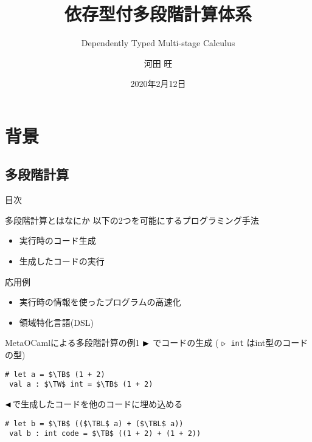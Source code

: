 \documentclass[dvipdfmx,aspectratio=169, 20pt]{beamer}
\title{依存型付多段階計算体系}
\subtitle{Dependently Typed Multi-stage Calculus}
\author{河田 旺}
\institute{京都大学大学院情報学研究科}
\date{2020年2月12日}
\begin{document}
\maketitle



\section{背景}
\subsection{多段階計算}

\begin{frame}{目次}


    \tableofcontents
\end{frame}

\begin{frame}[fragile]{多段階計算とはなにか}
    以下の2つを可能にするプログラミング手法
    \begin{itemize}
        \item 実行時のコード生成
        \item 生成したコードの実行
    \end{itemize}
    応用例
    \begin{itemize}
        \item 実行時の情報を使ったプログラムの高速化
        \item 領域特化言語(DSL)
    \end{itemize}
\end{frame}

\begin{frame}[fragile]{MetaOCamlによる多段階計算の例1}
    \( {\mathop{\blacktriangleright}} \) でコードの生成 ( \( {\mathop{\triangleright}} \)\ \verb|int| はint型のコードの型)
    \begin{exampleblock}{}
        \begin{Verbatim}[commandchars=\\\{\},codes={\catcode`$=3\catcode`^=7}]
 # let a = $\TB$ (1 + 2)
 val a : $\TW$ int = $\TB$ (1 + 2)
        \end{Verbatim}
    \end{exampleblock}
    \( {\mathop{\blacktriangleleft}} \)で生成したコードを他のコードに埋め込める
    \begin{exampleblock}{}
        \begin{Verbatim}[commandchars=\\\{\},codes={\catcode`$=3\catcode`^=7}]
 # let b = $\TB$ (($\TBL$ a) + ($\TBL$ a))
 val b : int code = $\TB$ ((1 + 2) + (1 + 2))
        \end{Verbatim}
    \end{exampleblock}
\end{frame}
\end{document}
